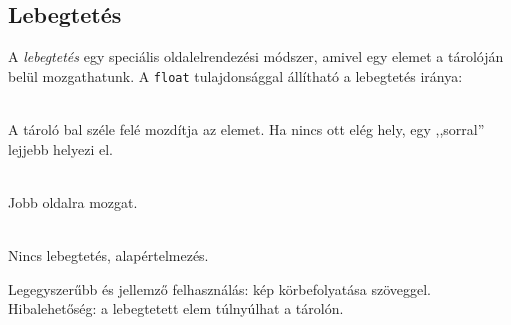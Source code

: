 \subsection{Lebegtetés}

\begin{frame}
  A \emph{lebegtetés} egy speciális oldalelrendezési módszer, amivel egy elemet a tárolóján belül mozgathatunk.
  A \texttt{float} tulajdonsággal állítható a lebegtetés iránya:
  \begin{description}[m]
    \item[\texttt{left}] \hfill \\ A tároló bal széle felé mozdítja az elemet. Ha nincs ott elég hely, egy ,,sorral'' lejjebb helyezi el.
    \item[\texttt{right}] \hfill \\ Jobb oldalra mozgat.
    \item[\texttt{none}] \hfill \\ Nincs lebegtetés, alapértelmezés.
  \end{description}
  Legegyszerűbb és jellemző felhasználás: kép körbefolyatása szöveggel. Hibalehetőség: a lebegtetett elem túlnyúlhat a tárolón.
\end{frame}

\begin{frame}
  \begin{columns}[c]
      \begin{exampleblock}{}
        \scriptsize
        
      \end{exampleblock}
      \begin{exampleblock}{}
        \scriptsize
        
      \end{exampleblock}
  \end{columns}
\end{frame}

